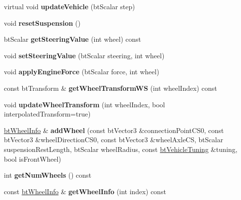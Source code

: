\begin{DoxyCompactItemize}
virtual void {\bfseries update\+Vehicle} (bt\+Scalar step)
\item 
\mbox{\label{classbtRaycastVehicle_a327f031abd00d7bee5546b7602d7fd6b}} 
void {\bfseries reset\+Suspension} ()
\item 
\mbox{\label{classbtRaycastVehicle_a61c029ffd3bec9c8404022ed20dd6264}} 
bt\+Scalar {\bfseries get\+Steering\+Value} (int wheel) const
\item 
\mbox{\label{classbtRaycastVehicle_afbbaf96eadb808cea4102b696abd4649}} 
void {\bfseries set\+Steering\+Value} (bt\+Scalar steering, int wheel)
\item 
\mbox{\label{classbtRaycastVehicle_aafe6f81794ec7ad1ce900bdca2facb92}} 
void {\bfseries apply\+Engine\+Force} (bt\+Scalar force, int wheel)
\item 
\mbox{\label{classbtRaycastVehicle_aa92f622b869f4791826568ad1f413a8e}} 
const bt\+Transform \& {\bfseries get\+Wheel\+Transform\+WS} (int wheel\+Index) const
\item 
\mbox{\label{classbtRaycastVehicle_adf67ae421334225c886c3dc4c12fe1f2}} 
void {\bfseries update\+Wheel\+Transform} (int wheel\+Index, bool interpolated\+Transform=true)
\item 
\mbox{\label{classbtRaycastVehicle_addafac85eaea4515b436e366e6d692ec}} 
\hyperlink{structbtWheelInfo}{bt\+Wheel\+Info} \& {\bfseries add\+Wheel} (const bt\+Vector3 \&connection\+Point\+C\+S0, const bt\+Vector3 \&wheel\+Direction\+C\+S0, const bt\+Vector3 \&wheel\+Axle\+CS, bt\+Scalar suspension\+Rest\+Length, bt\+Scalar wheel\+Radius, const \hyperlink{classbtRaycastVehicle_1_1btVehicleTuning}{bt\+Vehicle\+Tuning} \&tuning, bool is\+Front\+Wheel)
\item 
\mbox{\label{classbtRaycastVehicle_a49c9df37ed439ba8a5fe3a0c4a07047d}} 
int {\bfseries get\+Num\+Wheels} () const
\item 
\mbox{\label{classbtRaycastVehicle_abe3201b91a8cb71e08ec3b82667c6124}} 
const \hyperlink{structbtWheelInfo}{bt\+Wheel\+Info} \& {\bfseries get\+Wheel\+Info} (int index) const

\end{DoxyCompactItemize}
